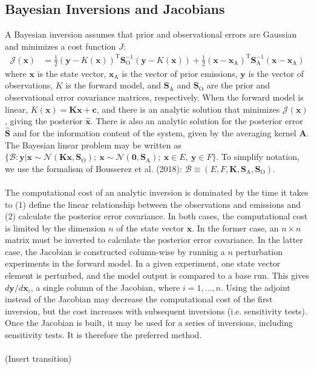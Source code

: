 \documentclass{article}
\newcommand{\const}{\mathbf{c}}
\newcommand{\x}{\mathbf{x}}
\newcommand{\xa}{\mathbf{x}_{\mathrm{A}}}
\newcommand{\y}{\mathbf{y}}
\newcommand{\K}{\mathbf{K}}
\newcommand{\so}{\mathbf{S}_{\mathrm{O}}}
\newcommand{\sa}{\mathbf{S}_{\mathrm{A}}}
\newcommand{\xpost}{\mathbf{\hat{x}}}
\newcommand{\spost}{\mathbf{\hat{S}}}
\newcommand{\A}{\mathbf{A}}
\begin{document}
\subsection{Bayesian Inversions and Jacobians}{\label{full_dim_invs}}
A Bayesian inversion assumes that prior and observational errors are Gaussian and minimizes a cost function $\mathit{J}$:
\begin{align}
	\mathcal{J}(\x) &= \frac{1}{2}(\y - K(\x))^\mathrm{T}\so^{-1}(\y - K(\x)) + \frac{1}{2}(\x - \xa)^\mathrm{T}\sa^{-1}(\x - \xa)
\end{align}
where $\x$ is the state vector, $\xa$ is the vector of prior emissions, $\y$ is the vector of observations, $K$ is the forward model, and $\sa$ and $\so$ are the prior and observational error covariance matrices, respectively. When the forward model is linear, $K(\x) = \K\x + \const$, and there is an analytic solution that minimizes $\mathcal{J}(\x)$, giving the posterior $\xpost$. There is also an analytic solution for the posterior error $\spost$ and for the information content of the system, given by the averaging kernel $\A$. The Bayesian linear problem may be written as $\{\mathcal{B} : \y \vert \x \sim \mathcal{N}(\K\x, \so);\ \x \sim \mathcal{N}(\mathbf{0}, \sa);\ \x \in E,\ \y \in F\}$. To simplify notation, we use the formalism of Bousserez et al. (2018): $\mathcal{B} \equiv (E, F, \K, \sa, \so)$.\\
\\
The computational cost of an analytic inversion is dominated by the time it takes to (1) define the linear relationship between the observations and emissions and (2) calculate the posterior error covariance. In both cases, the computational cost is limited by the dimension $n$ of the state vector $\x$. In the former case, an $n \times n$ matrix must be inverted to calculate the posterior error covariance. In the latter case, the Jacobian is constructed column-wise by running a $n$ perturbation experiments in the forward model. In a given experiment, one state vector element is perturbed, and the model output is compared to a base run. This gives $d\y/d\x_i$, a single column of the Jacobian, where $i = {1, ... , n}$. Using the adjoint instead of the Jacobian may decrease the computational cost of the first inversion, but the cost increases with subsequent inversions (i.e. sensitivity tests). Once the Jacobian is built, it may be used for a series of inversions, including sensitivity tests. It is therefore the preferred method.\\
\\
(Insert transition)
\end{document}
